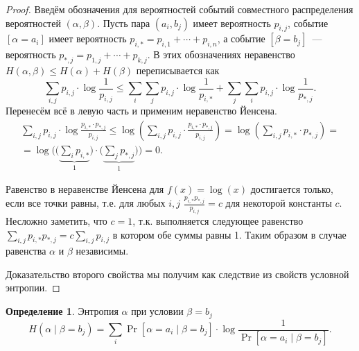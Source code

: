 \documentclass[12pt]{article}
\theoremstyle{definition}
\newtheorem{definition}{Определение}[section]
\theoremstyle{plain}
\theoremstyle{remark}
\begin{document}
\begin{proof}
Введём обозначения для вероятностей событий совместного распределения вероятностей \((\alpha, \beta)\). Пусть пара \((a_i, b_j)\) имеет вероятность \(p_{i,j}\), событие \([\alpha=a_i]\) имеет вероятность \(p_{i,*} = p_{i,1} + \dotsb + p_{i,n}\), а событие 
\([\beta=b_j]\)~--- вероятность \(p_{*,j} = p_{1,j} + \dotsb + p_{k,j}\). В этих обозначениях неравенство \(H(\alpha, \beta) \le H(\alpha) + H(\beta)\) переписывается как
\[
\sum_{i,j} p_{i,j}\cdot \log\frac1{p_{i,j}} \le
\sum_{i}\sum_{j} p_{i,j}\cdot \log\frac1{p_{i,*}} +
\sum_{j}\sum_{i} p_{i,j}\cdot \log\frac1{p_{*,j}}.
\]
Перенесём всё в левую часть и применим неравенство Йенсена.
\begin{multline*}
\sum_{i,j}p_{i,j}\cdot \log\frac{p_{i,*}\cdot p_{*,j}}{p_{i,j}} \le
\log\left(\sum_{i,j}p_{i,j}\cdot \frac{p_{i,*}\cdot p_{*,j}}{p_{i,j}}\right) =
\log\left(\sum_{i,j}p_{i,*}\cdot p_{*,j}\right) = \\
= \log \Biggl(\biggl(\underbrace{\sum_{i}p_{i,*}}_1\biggr)\cdot
     \biggl(\underbrace{\sum_{j}p_{*,j}}_1\biggr)\Biggr) = 0.
\end{multline*}

Равенство в неравенстве Йенсена для $f(x) = \log(x)$ достигается только, если все точки равны, т.е. 
для любых \(i,j\) \(\frac{p_{i,*}p_{*,j}}{p_{i,j}} = c\) для некоторой константы \(c\). Несложно заметить, что \(c =
1\), т.к. выполняется следующее равенство \(\sum_{i,j} {p_{i,*}p_{*,j}} = c \sum_{i,j}{p_{i,j}}\) в котором обе суммы
равны 1. Таким образом в случае равенства \(\alpha\) и \(\beta\) независимы.

Доказательство второго свойства мы получим как следствие из свойств условной энтропии.
\end{proof}

\begin{definition}\label{def:cond-entropy1}
Энтропия \(\alpha\) при условии \(\beta = b_j\)
\[H(\alpha\mid\beta = b_j) = \sum_i \Pr[\alpha = a_i\mid \beta = b_j]\cdot
    \log\frac{1}{\Pr[\alpha = a_i\mid \beta = b_j]}. \]
\end{definition}
\end{document}
